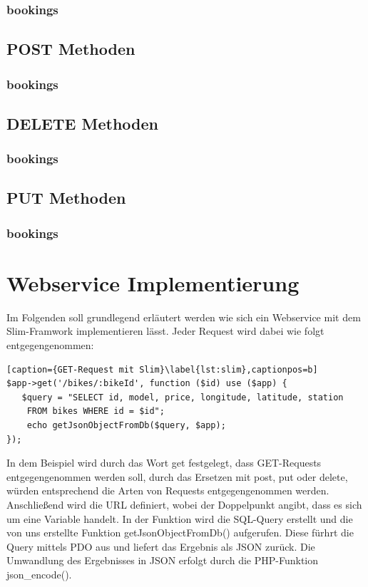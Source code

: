\subsection{bookings}

\section{POST Methoden}
\subsection{bookings}

\section{DELETE Methoden}
\subsection{bookings}

\section{PUT Methoden}
\subsection{bookings}


\chapter{Webservice Implementierung}
Im Folgenden soll grundlegend erläutert werden wie sich ein Webservice mit dem Slim-Framwork implementieren lässt. Jeder Request wird dabei wie folgt entgegengenommen:
\begin{lstlisting}[caption={GET-Request mit Slim}\label{lst:slim},captionpos=b] 
$app->get('/bikes/:bikeId', function ($id) use ($app) {
   $query = "SELECT id, model, price, longitude, latitude, station 
	FROM bikes WHERE id = $id";
    echo getJsonObjectFromDb($query, $app); 
});
\end{lstlisting}
In dem Beispiel wird durch das Wort get festgelegt, dass GET-Requests entgegengenommen werden soll, durch das Ersetzen mit post, put oder delete, würden entsprechend die Arten von Requests entgegengenommen werden. Anschließend wird die URL definiert, wobei der Doppelpunkt angibt, dass es sich um eine Variable handelt. In der Funktion wird die SQL-Query erstellt und die von uns erstellte Funktion getJsonObjectFromDb() aufgerufen. Diese fürhrt die Query mittels PDO aus und liefert das Ergebnis als JSON zurück. Die Umwandlung des Ergebnisses in JSON erfolgt durch die PHP-Funktion json\_encode().

